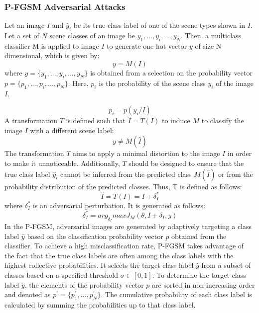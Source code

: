 \documentclass[sn-mathphys]{sn-jnl}%
\theoremstyle{thmstyleone}%
\theoremstyle{thmstyletwo}%
\theoremstyle{thmstylethree}%
\begin{document}
\subsubsection{P-FGSM Adversarial Attacks}
 Let an image $I$ and $\hat y_i$ be its true class label of one of the scene types shown in $I$. Let a set of $N$ scene classes of an image be ${y_1, ..., y_i, ..., y_N}$. Then, a multiclass classifier M is applied to image $I$ to generate one-hot vector $y$ of size N-dimensional, which is given by:
\begin{equation}
 y = M(I)
\end{equation}
where $ y = \{ y_1,..., y_i, ..., y_N \}$ is obtained from a selection on the probability vector $ p = \{p_1,..., p_i,...,p_N \}$. Here, $p_i$ is the probability of the scene class $y_i$ of the image $I$.
 
\begin{equation}
 p_i = p(y_i/I)
\end{equation}
A transformation $T$ is defined such that $\hat I = T(I)$ to induce $M$ to classify the image $I$ with a different scene label:
\begin{equation}
y \neq M(\hat I)
\end{equation}
The transformation $T$ aims to apply a minimal distortion to the image $I$ in order to make it unnoticeable. Additionally, $T$ should be designed to ensure that the true class label $\hat y_i$ cannot be inferred from the predicted class $M(\hat I)$ or from the probability distribution of the predicted classes. Thus, T is defined as follows:
\begin{equation}
 \hat I = T(I) = I + \delta^*_I
\end{equation}
where $\delta^*_I$ is an adversarial perturbation. It is generated as follows:
\begin{equation}
 \delta^*_I = arg_{\delta_I}max J_M (\theta, I + \delta_I, y)
\end{equation}
In the P-FGSM, adversarial images are generated by adaptively targeting a class label $\hat y$ based on the classification probability vector $p$ obtained from the classifier. To achieve a high misclassification rate, P-FGSM takes advantage of the fact that the true class labels are often among the class labels with the highest collective probabilities. It selects the target class label $\hat y$ from a subset of classes based on a specified threshold $\sigma \in [0,1]$. To determine the target class label $\hat y$, the elements of the probability vector $p$ are sorted in non-increasing order and denoted as $ p^{\prime} = \{p^{\prime}_1, ..., p^{\prime}_N \}$. The cumulative probability of each class label is calculated by summing the probabilities up to that class label. 
\end{document}
